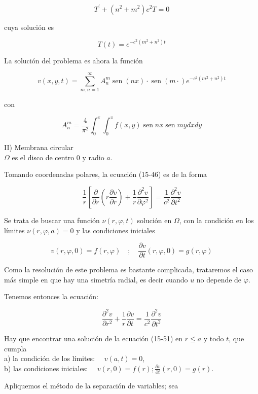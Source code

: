 \documentclass[10pt]{article}
\theoremstyle{plain}
\theoremstyle{definition}
\theoremstyle{remark}
\begin{document}
$$
T^{\prime}+\left(n^{2}+m^{2}\right) c^{2} T=0
$$

cuya solución es

$$
T(t)=e^{-c^{2}\left(m^{2}+n^{2}\right) t}
$$

La solución del problema es ahora la función

$$
v(x, y, t)=\sum_{m, n=1}^{\infty} A_{n}^{m} \operatorname{sen}(n x) \cdot \operatorname{sen}(m \cdot) e^{-c^{2}\left(m^{2}+n^{2}\right) t}
$$

con

$$
A_{n}^{m}=\frac{4}{\pi^{2}} \int_{0}^{\pi} \int_{0}^{\pi} f(x, y) \operatorname{sen} n x \operatorname{sen} m y d x d y
$$

II) Membrana circular\\
$\Omega$ es el disco de centro 0 y radio $a$.

Tomando coordenadas polares, la ecuación (15-46) es de la forma

$$
\frac{1}{r}\left[\frac{\partial}{\partial r}\left(r \frac{\partial v}{\partial r}\right)+\frac{1}{r} \frac{\partial^{2} v}{\partial \varphi^{2}}\right]=\frac{1}{c^{2}} \frac{\partial^{2} v}{\partial t^{2}}
$$

Se trata de buscar una función $\nu(r, \varphi, t)$ solución en $\Omega$, con la condición en los límites $\nu(r, \varphi, a)=0$ y las condiciones iniciales

$$
v(r, \varphi, 0)=f(r, \varphi) \quad ; \quad \frac{\partial v}{\partial t}(r, \varphi, 0)=g(r, \varphi)
$$

Como la resolución de este problema es bastante complicada, trataremos el caso más simple en que hay una simetría radial, es decir cuando $u$ no depende de $\varphi$.

Tenemos entonces la ecuación:


\begin{equation*}
\frac{\partial^{2} v}{\partial r^{2}}+\frac{1}{r} \frac{\partial v}{\partial t}=\frac{1}{c^{2}} \frac{\partial^{2} v}{\partial t^{2}} \tag{15-51}
\end{equation*}


Hay que encontrar una solución de la ecuación (15-51) en $r \leqslant a$ y todo $t$, que cumpla\\
a) la condición de los límites: $\quad v(a, t)=0$,\\
b) las condiciones iniciales: $\quad v(r, 0)=f(r) ; \frac{\partial v}{\partial t}(r, 0)=g(r)$.

Apliquemos el método de la separación de variables; sea
\end{document}
